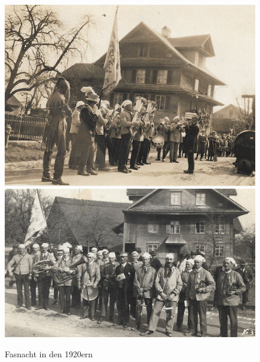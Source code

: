 \begin{figure}[!ht]
    \centerline{
        \includegraphics{./chap/1900-1925/Fasnacht-1920er-1.jpg}
        \includegraphics{./chap/1900-1925/Fasnacht-1920er-2.jpg}}
    \label{fig:mgh-fasnacht-1920}
    \caption{Fasnacht in den 1920ern}
\end{figure}

